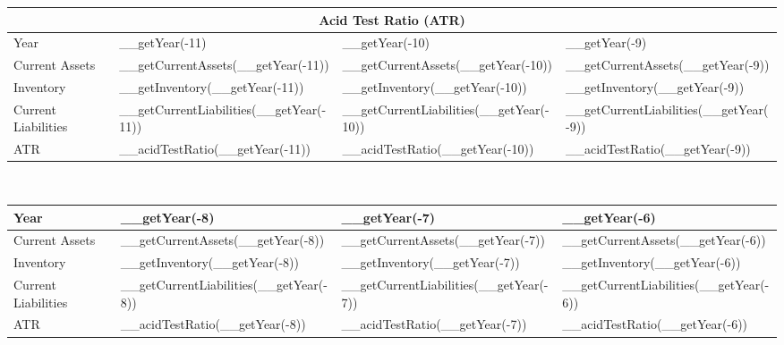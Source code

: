 \begin{tabularx}{\textwidth}{|X|X|X|X|}
 \hline
 \multicolumn{4}{|c|}{Acid Test Ratio (ATR)} \\
 \hline
 Year                     & __getYear(-11)                          & __getYear(-10)                          & __getYear(-9)                          \\
 \hline
 Current Assets           & __getCurrentAssets(__getYear(-11))      & __getCurrentAssets(__getYear(-10))      & __getCurrentAssets(__getYear(-9))      \\
 Inventory                & __getInventory(__getYear(-11))          & __getInventory(__getYear(-10))          & __getInventory(__getYear(-9))          \\
 Current Liabilities      & __getCurrentLiabilities(__getYear(-11)) & __getCurrentLiabilities(__getYear(-10)) & __getCurrentLiabilities(__getYear(-9)) \\
 \rowcolor{lightgray} ATR & __acidTestRatio(__getYear(-11))         & __acidTestRatio(__getYear(-10))         & __acidTestRatio(__getYear(-9))         \\
 \hline
\end{tabularx}\\

\begin{tabularx}{\textwidth}{|X|X|X|X|}
 \hline
 Year                     & __getYear(-8)                          & __getYear(-7)                          & __getYear(-6)                          \\
 \hline
 Current Assets           & __getCurrentAssets(__getYear(-8))      & __getCurrentAssets(__getYear(-7))      & __getCurrentAssets(__getYear(-6))      \\
 Inventory                & __getInventory(__getYear(-8))          & __getInventory(__getYear(-7))          & __getInventory(__getYear(-6))          \\
 Current Liabilities      & __getCurrentLiabilities(__getYear(-8)) & __getCurrentLiabilities(__getYear(-7)) & __getCurrentLiabilities(__getYear(-6)) \\
 \rowcolor{lightgray} ATR & __acidTestRatio(__getYear(-8))         & __acidTestRatio(__getYear(-7))         & __acidTestRatio(__getYear(-6))         \\
 \hline
\end{tabularx}\\


